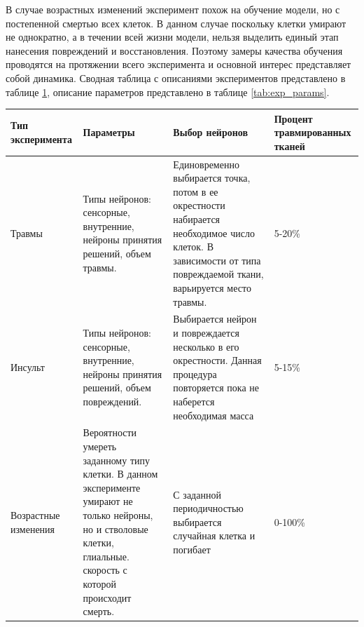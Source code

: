\documentclass{spbau-diploma}
\begin{document}
В случае возрастных изменений эксперимент похож на обучение модели, но с постепенной смертью всех клеток. В данном случае поскольку клетки умирают не однократно, а в течении всей жизни модели, нельзя выделить единый этап нанесения повреждений и восстановления. Поэтому замеры качества обучения проводятся на протяжении всего эксперимента и основной интерес представляет собой динамика. Сводная таблица с описаниями экспериментов представлено в таблице \ref{tab:experiments}, описание параметров представлено в таблице \ref{tab:exp_params}.


\begin{table}
    \centering
    \begin{tabular}{ | p{2.5cm} | p{3.5cm} | p{5cm} | p{2cm} |}
    \hline
    Тип эксперимента & Параметры & Выбор нейронов & Процент травмированных тканей \\ \hline
    Травмы & Типы нейронов: сенсорные, внутренние, нейроны принятия решений, объем травмы. & Единовременно выбирается точка, потом в ее окрестности набирается необходимое число клеток. В зависимости от типа повреждаемой ткани, варьируется место травмы. & 5-20\% \\ \hline
    Инсульт & Типы нейронов: сенсорные, внутренние, нейроны принятия решений, объем повреждений. & Выбирается нейрон и повреждается несколько в его окрестности. Данная процедура повторяется пока не наберется необходимая масса & 5-15\% \\ \hline
    Возрастные изменения & Вероятности умереть заданному типу клетки. В данном эксперименте умирают не только нейроны, но и стволовые клетки, глиальные. скорость с которой происходит смерть. & С заданной периодичностью выбирается случайная клетка и погибает & 0-100\% \\
    \hline
    \end{tabular}
    \label{tab:experiments}
\end{table}
\end{document}
